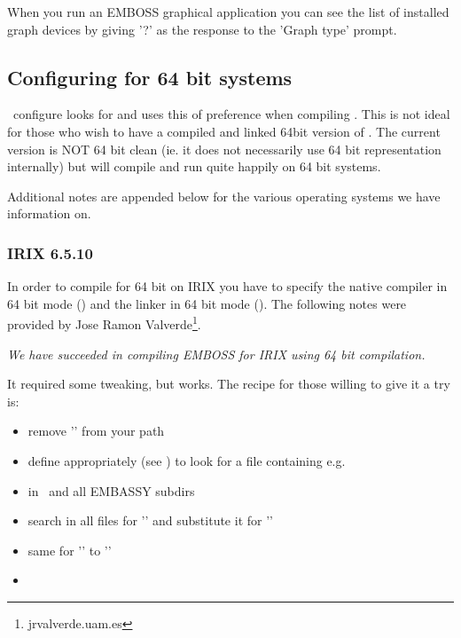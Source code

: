 \documentclass{report}
\begin{document}
When you run an EMBOSS graphical application you can see the list of
installed graph devices by giving '?' as the response to the 'Graph
type' prompt.

\subsection{Configuring for 64 bit systems}

\EMBOSS\ configure looks for  and uses this of
preference when compiling \EMBOSS. This is not ideal for those who
wish to have a compiled and linked 64bit version of \EMBOSS. The
current version is NOT 64 bit clean (ie. it does not necessarily use
64 bit representation internally) but will compile and run quite
happily on 64 bit systems.

Additional notes are appended below for the various operating systems
we have information on.

\subsubsection{IRIX 6.5.10}

In order to compile for 64 bit on IRIX you have to specify the native
compiler in 64 bit mode () and the linker in 64 bit
mode (). The following notes were provided by Jose
Ramon Valverde\footnote{jrvalverde\@@cnb.uam.es}.


{\it We have succeeded in compiling EMBOSS for IRIX using 64 bit
compilation.

It required some tweaking, but works. The recipe for those willing to
give it a try is: }

\begin{itemize}
	\item remove '' from your path
	\item define  appropriately
	(see ) to look for a
	 file containing
	e.g. 
	\item {} in \EMBOSS\ and all EMBASSY subdirs
	\item search in all files for '' and
	substitute it for ''
	\item same for '' to ''
	\item {}
\end{itemize}
\end{document}
